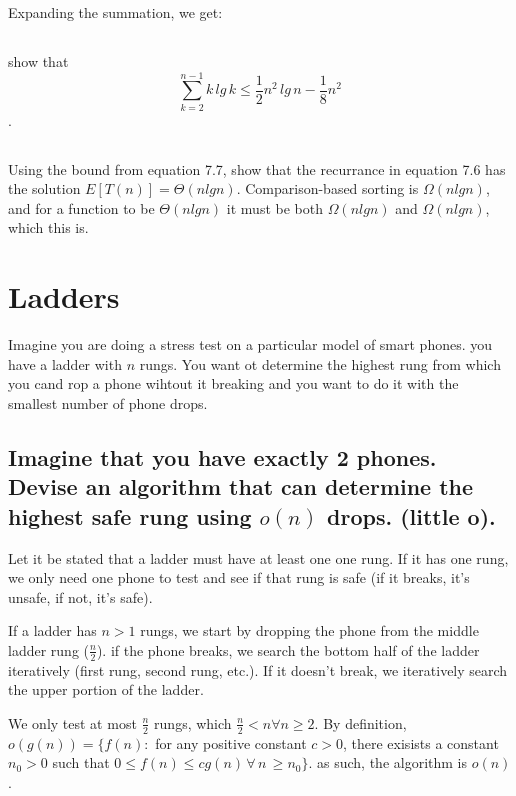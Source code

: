 \documentclass[titlepage]{article}\usepackage[]{graphicx}\usepackage[]{color}
\begin{document}
Expanding the summation, we get:


\subsection{}
show that 
\[ \sum_{k=2}^{n-1}k\, lg\, k \leq \frac{1}{2} n^2\, lg\, n - \frac{1}{8} n^2 \].

\subsection{}

Using the bound from equation 7.7, show that the recurrance in equation 7.6 has
the solution $E[T(n)] = \Theta(n lg n)$. 
Comparison-based sorting is $\Omega(n lg n)$, and for a function to be
$\Theta(n lg n)$ it must be both $\Omega(n lg n)$ and $\Omega(n lg n)$, which
this is. 




\section{ Ladders }
  Imagine you are doing a stress test on a particular model of smart phones. you
  have a ladder with $n$ rungs. You want ot determine the highest rung from which
  you cand rop a phone wihtout it breaking and you want to do it with the
smallest number of phone drops. 

\subsection{ Imagine that you have exactly 2 phones. Devise an algorithm that
  can determine
the highest safe rung using $o(n)$ drops. (little o). }

  Let it be stated that a ladder must have at least one one rung. If it has
  one rung, we only need one phone to test and see if that rung is safe (if it
  breaks, it's unsafe, if not, it's safe).

  If a ladder has $n > 1$ rungs, we start by dropping the phone from the middle
  ladder rung ($\frac{n}{2}$). if the phone breaks, we search the bottom half of the
  ladder iteratively (first rung, second rung, etc.). If it doesn't break, we
  iteratively search the upper portion of the ladder. 

  We only test at most $\frac{n}{2}$ rungs, which $\frac{n}{2} < n
  \forall n \geq 2$. 
  By definition, $o(g(n)) = \{ f(n) : $ for any positive constant $c>0$, there
  exisists a constant $n_0 > 0$ such that $0 \leq f(n) \leq cg(n) \, \forall \,
  n \, \geq n_0\}$.
  as such, the algorithm is $o(n)$. 
\end{document}
